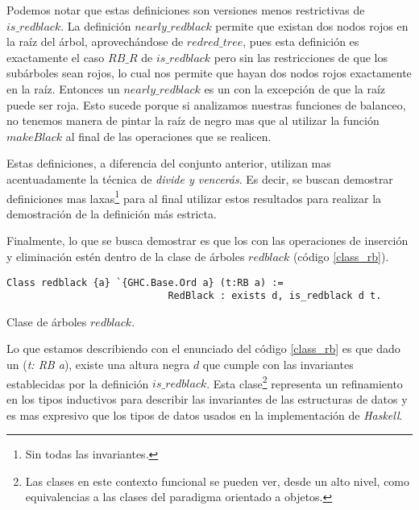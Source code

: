 Podemos notar que estas definiciones son versiones menos restrictivas de 
\hyperref[inductive_isRedB]{$is\_redblack$}. La definici\'on 
\hyperref[inductive_isRedB]{$nearly\_redblack$} permite que existan dos nodos rojos en la ra\'iz del 
\'arbol, aprovech\'andose de \hyperref[inductive_isRedB]{$redred\_tree$}, pues esta definici\'on es 
exactamente el caso $RB\_R$ de \hyperref[inductive_isRedB]{$is\_redblack$} pero sin las 
restricciones de que los sub\'arboles sean rojos, lo cual nos permite que hayan dos nodos rojos 
exactamente en la ra\'iz. Entonces un \hyperref[inductive_isRedB]{$nearly\_redblack$} es un {\arn} 
con la excepci\'on de que la ra\'iz puede ser roja. Esto sucede porque si analizamos nuestras funciones de 
balanceo, no tenemos manera de pintar la raíz de negro mas que al utilizar la función 
\hyperref[raiz_negra_func]{$makeBlack$} al final de las operaciones que se realicen. 

Estas definiciones, a diferencia del conjunto anterior, utilizan mas acentuadamente la t\'ecnica de 
\textit{divide y vencerás}. Es decir, se buscan demostrar definiciones mas laxas\footnote{Sin todas 
las invariantes.} para al final utilizar estos resultados para realizar la demostraci\'on de la 
definición m\'as estricta.

Finalmente, lo que se busca demostrar es que los {\arns} con las operaciones de inserci\'on y
eliminaci\'on est\'en dentro de la clase de \'arboles $redblack$ (c\'odigo \ref{class_rb}).

\begin{listing}[!ht]
\centering
\captionsetup{justification=centering}
\begin{verbatim}
Class redblack {a} `{GHC.Base.Ord a} (t:RB a) :=
                            RedBlack : exists d, is_redblack d t.
\end{verbatim}
\caption{Clase de \'arboles $redblack$.}
\label{class_rb}
\end{listing}

Lo que estamos describiendo con el enunciado del c\'odigo \ref{class_rb} es que dado un {\arn} 
(\textit{t: RB a}), existe una altura negra $d$ que cumple con las invariantes establecidas por la 
definici\'on \hyperref[inductive_isRedB]{$is\_redblack$}. Esta clase\footnote{Las clases en este 
contexto funcional se pueden ver, desde un alto nivel, como equivalencias a las clases del paradigma 
orientado a objetos.} representa un refinamiento en los tipos inductivos para describir las 
invariantes de las estructuras de datos y es mas expresivo que los tipos de datos usados en la 
implementaci\'on de \textit{Haskell}.

